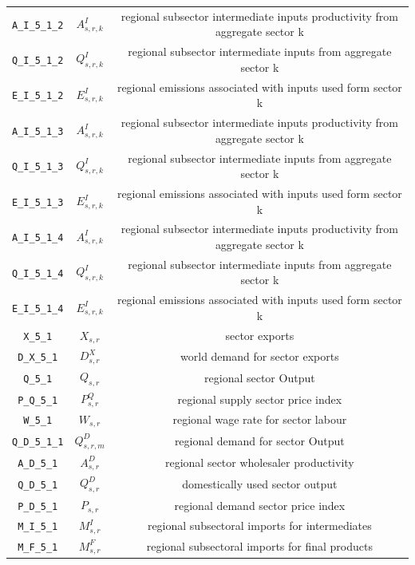 \begin{center}
\begin{longtable}{ccc}
\texttt{A\_I\_5\_1\_2} & ${A^{I}_{s,r,k}}$ & regional subsector intermediate inputs productivity from aggregate sector k\\
\texttt{Q\_I\_5\_1\_2} & ${Q^{I}_{s,r,k}}$ & regional subsector intermediate inputs from aggregate sector k\\
\texttt{E\_I\_5\_1\_2} & ${E^I_{s,r,k}}$ & regional emissions associated with inputs used form sector k\\
\texttt{A\_I\_5\_1\_3} & ${A^{I}_{s,r,k}}$ & regional subsector intermediate inputs productivity from aggregate sector k\\
\texttt{Q\_I\_5\_1\_3} & ${Q^{I}_{s,r,k}}$ & regional subsector intermediate inputs from aggregate sector k\\
\texttt{E\_I\_5\_1\_3} & ${E^I_{s,r,k}}$ & regional emissions associated with inputs used form sector k\\
\texttt{A\_I\_5\_1\_4} & ${A^{I}_{s,r,k}}$ & regional subsector intermediate inputs productivity from aggregate sector k\\
\texttt{Q\_I\_5\_1\_4} & ${Q^{I}_{s,r,k}}$ & regional subsector intermediate inputs from aggregate sector k\\
\texttt{E\_I\_5\_1\_4} & ${E^I_{s,r,k}}$ & regional emissions associated with inputs used form sector k\\
\texttt{X\_5\_1} & ${X_{s,r}}$ & sector exports\\
\texttt{D\_X\_5\_1} & ${D^{X}_{s,r}}$ & world demand for sector exports\\
\texttt{Q\_5\_1} & ${Q_{s,r}}$ & regional sector Output\\
\texttt{P\_Q\_5\_1} & ${P^Q_{s,r}}$ & regional supply sector price index\\
\texttt{W\_5\_1} & ${W_{s,r}}$ & regional wage rate for sector labour\\
\texttt{Q\_D\_5\_1\_1} & ${Q^D_{s,r,m}}$ & regional demand for sector Output\\
\texttt{A\_D\_5\_1} & ${A^{D}_{s,r}}$ & regional sector wholesaler productivity\\
\texttt{Q\_D\_5\_1} & ${Q^{D}_{s,r}}$ & domestically used sector output\\
\texttt{P\_D\_5\_1} & ${P_{s,r}}$ & regional demand sector price index\\
\texttt{M\_I\_5\_1} & ${M^I_{s,r}}$ & regional subsectoral imports for intermediates\\
\texttt{M\_F\_5\_1} & ${M^F_{s,r}}$ & regional subsectoral imports for final products\\

\end{longtable}
\end{center}
